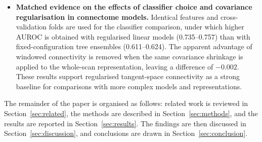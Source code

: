 \begin{itemize}
\item \textbf{Matched evidence on the effects of classifier choice and covariance regularisation in connectome models.} Identical features and cross-validation folds are used for the classifier comparison, under which higher AUROC is obtained with regularised linear models (0.735--0.757) than with fixed-configuration tree ensembles (0.611--0.624). The apparent advantage of windowed connectivity is removed when the same covariance shrinkage is applied to the whole-scan representation, leaving a difference of $-0.002$. These results support regularised tangent-space connectivity as a strong baseline for comparisons with more complex models and representations.

\end{itemize}
The remainder of the paper is organised as follows: related work is reviewed in
Section~\ref{sec:related}, the methods are described in
Section~\ref{sec:methods}, and the results are reported in Section~\ref{sec:results}.
The findings are then discussed in Section~\ref{sec:discussion}, and conclusions are drawn in
Section~\ref{sec:conclusion}.
